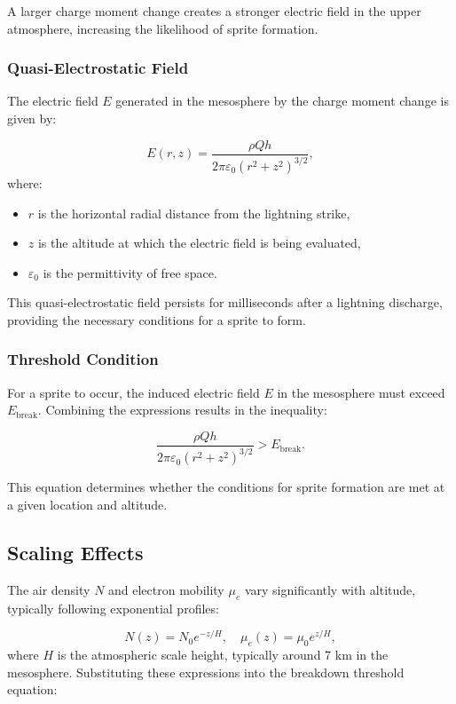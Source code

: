 \documentclass[a4paper,10pt]{article}
\begin{document}
A larger charge moment change creates a stronger electric field in the upper atmosphere, increasing the likelihood of sprite formation.


\subsubsection*{Quasi-Electrostatic Field}
The electric field $E$ generated in the mesosphere by the charge moment change is given by:


\begin{equation*}
E(r, z) = \frac{\rho Q h}{2 \pi \varepsilon_0 (r^2 + z^2)^{3/2}},
\end{equation*}
where:
\begin{itemize}
\item $r$ is the horizontal radial distance from the lightning strike,
\item $z$ is the altitude at which the electric field is being evaluated,
\item $\varepsilon_0$ is the permittivity of free space.
\end{itemize}


This quasi-electrostatic field persists for milliseconds after a lightning discharge, providing the necessary conditions for a sprite to form.


\subsubsection*{Threshold Condition}
For a sprite to occur, the induced electric field $E$ in the mesosphere must exceed $E_\text{break}$. Combining the expressions results in the inequality:


\begin{equation*}
\frac{\rho Q h}{2 \pi \varepsilon_0 (r^2 + z^2)^{3/2}} > E_\text{break}.
\end{equation*}


This equation determines whether the conditions for sprite formation are met at a given location and altitude.


\subsection*{Scaling Effects}
The air density $N$ and electron mobility $\mu_e$ vary significantly with altitude, typically following exponential profiles:


\begin{equation*}
N(z) = N_0 e^{-z/H}, \quad \mu_e(z) = \mu_0 e^{z/H},
\end{equation*}
where $H$ is the atmospheric scale height, typically around 7 km in the mesosphere. Substituting these expressions into the breakdown threshold equation:
\end{document}
